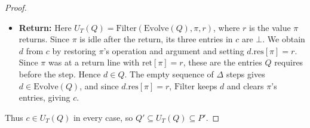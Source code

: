 \documentclass[12pt]{amsproc}
\begin{document}
\begin{enumerate}
\begin{proof}
\begin{itemize}
\begin{enumerate}
            Since $\pi$ moves to either \texttt{SR} or \texttt{S3}, we need to check the three results $Q'$ allows for $\pi$:
            \begin{itemize}
                \item If $c$ records $\bot$, then $\pi$ is at \texttt{S3} and $c=d$, so we use the empty sequence of $\Delta$ steps.
                \item If $c$ records \True{}, then $\pi$ moved to \texttt{SR}, since $Q'$ does not allow \True{} at \texttt{S3}. So the test at \texttt{S2} succeeded, and $u[\pi]=\partition(b)$. By idempotence, $\partition(a)=\partition(u[\pi])=\partition(\partition(b))=\partition(b)$, so the sequential \SameSet{} on $(a,b)$ returns \True{}.
                \item If $c$ records \False{}, then $\pi$ moved to \texttt{S3}, since at \texttt{SR} the result must be \True{}. So the test at \texttt{S2} failed, and $u[\pi]\neq\partition(b)$. Since $Q'$ allows \False{} at \texttt{S3} only if $u[\pi]$ is a representative, $\partition(a)=\partition(u[\pi])=u[\pi]\neq\partition(b)$, so the sequential \SameSet{} on $(a,b)$ returns \False{}.
            \end{itemize}

            In the last two cases, $\partition$ is unchanged and only $\pi$'s result is updated, so $\Delta(d,\pi,c)$.
          

            \item \textbf{\texttt{S3}:}
            If $\pi$ retries at \texttt{S1}, then $c.\mathrm{res}[\pi]=\bot$, which is allowed before the step at \texttt{S3}. If $\pi$ moves to \texttt{SR}, then $c.\mathrm{res}[\pi]=\False{}$. This branch is only taken when $\partition(u[\pi])=u[\pi]$, so \False{} is also allowed before the step at \texttt{S3}. Thus $c\in Q$ in either case, and we use the empty sequence of $\Delta$ steps.
        \end{enumerate}

        \item \textbf{Return:}
        Here $U_T(Q)=\mathrm{Filter}(\mathrm{Evolve}(Q),\pi,r)$, where $r$ is the value $\pi$ returns. Since $\pi$ is idle after the return, its three entries in $c$ are $\bot$. We obtain $d$ from $c$ by restoring $\pi$'s operation and argument and setting $d.\mathrm{res}[\pi]=r$. Since $\pi$ was at a return line with $\mathrm{ret}[\pi]=r$, these are the entries $Q$ requires before the step. Hence $d\in Q$. The empty sequence of $\Delta$ steps gives $d\in\mathrm{Evolve}(Q)$, and since $d.\mathrm{res}[\pi]=r$, $\mathrm{Filter}$ keeps $d$ and clears $\pi$'s entries, giving $c$.
    \end{itemize}

    Thus $c\in U_T(Q)$ in every case, so $Q'\subseteq U_T(Q)\subseteq P'$.
    \end{proof}
\end{enumerate}
\end{document}
